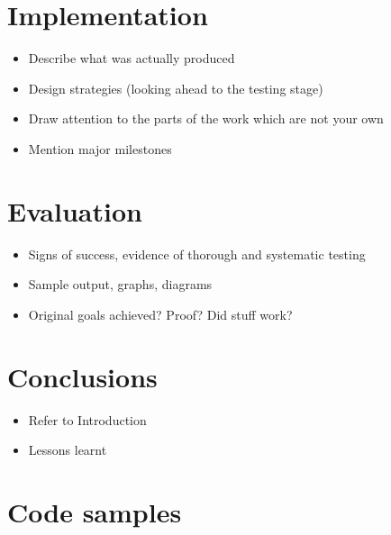 \documentclass[11pt,chapterprefix=true,toc=bibliography]{scrreprt}
\begin{document}
\chapter{Implementation%
  \label{implementation}%
}

\begin{itemize}
    \item Describe what was actually produced
    \item Design strategies (looking ahead to the testing stage)
    \item Draw attention to the parts of the work which are not your own
    \item Mention major milestones
\end{itemize}

\chapter{Evaluation%
  \label{evaluation}%
}

\begin{itemize}
    \item Signs of success, evidence of thorough and systematic testing
    \item Sample output, graphs, diagrams
    \item Original goals achieved? Proof? Did stuff work?
\end{itemize}

\chapter{Conclusions%
  \label{conclusions}%
}

\begin{itemize}
    \item Refer to Introduction
    \item Lessons learnt
\end{itemize}




\appendix

\chapter{Code samples%
  \label{code-samples}%
}
\end{document}
